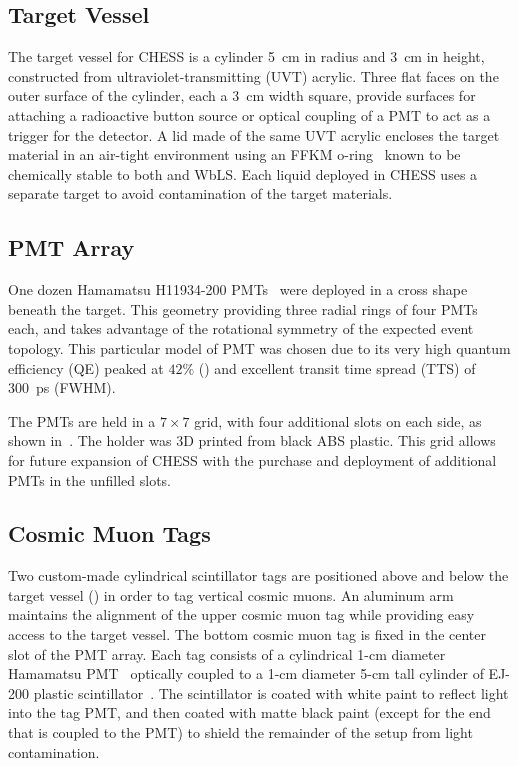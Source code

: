 \subsection{Target Vessel}
The target vessel for CHESS is a cylinder 5~cm in radius and 3~cm in height, constructed from ultraviolet-transmitting (UVT) acrylic. 
Three flat faces on the outer surface of the cylinder, each a 3~cm width square, provide surfaces for attaching a radioactive button source or optical coupling of a PMT to act as a trigger for the detector. 
A lid made of the same UVT acrylic encloses the target material in an air-tight environment using an FFKM o-ring~\cite{cog-oring} known to be chemically stable to both {\labppo} and WbLS. 
Each liquid deployed in CHESS uses a separate target to avoid contamination of the target materials.

\subsection{PMT Array}
\label{pmtarray}

One dozen Hamamatsu H11934-200 PMTs~\cite{h11934} were deployed in a cross shape beneath the target.
This geometry providing three radial rings of four PMTs each, and takes advantage of the rotational symmetry of the expected event topology. 
This particular model of PMT was chosen due to its very high quantum efficiency (QE) peaked at $42\%$ () and excellent transit time spread (TTS) of 300~ps (FWHM).

The PMTs are held in a $7 \times 7$ grid, with four additional slots on each side, as shown in~. 
The holder was 3D printed from black ABS plastic.
This grid allows for future expansion of CHESS with the purchase and deployment of additional PMTs in the unfilled slots.

\subsection{Cosmic Muon Tags}

Two custom-made cylindrical scintillator tags are positioned above and below the target vessel () in order to tag vertical cosmic muons.  
An aluminum arm maintains the alignment of the upper cosmic muon tag while providing easy access to the target vessel.
The bottom cosmic muon tag is fixed in the center slot of the PMT array. 
Each tag consists of a cylindrical 1-cm diameter Hamamatsu PMT~\cite{h3164} optically coupled to a 1-cm diameter 5-cm tall cylinder of EJ-200 plastic scintillator~\cite{ej200}.
The scintillator is coated with white paint to reflect light into the tag PMT, and then coated with matte black paint (except for the end that is coupled to the PMT) to shield the remainder of the setup from light contamination. 

